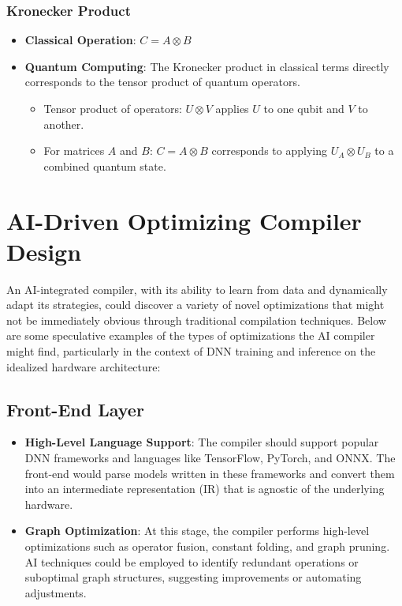 \documentclass{article}
\begin{document}
\subsubsection{Kronecker Product}
\begin{itemize}
    \item \textbf{Classical Operation}: \( C = A \otimes B \)
    \item \textbf{Quantum Computing}: The Kronecker product in classical terms directly corresponds to the tensor product of quantum operators.
    \begin{itemize}
        \item Tensor product of operators: \( U \otimes V \) applies \( U \) to one qubit and \( V \) to another.
        \item For matrices \( A \) and \( B \): \( C = A \otimes B \) corresponds to applying \( U_A \otimes U_B \) to a combined quantum state.
    \end{itemize}
\end{itemize}

\section{AI-Driven Optimizing Compiler Design}

An AI-integrated compiler, with its ability to learn from data and dynamically adapt its strategies, could discover a variety of novel optimizations that might not be immediately obvious through traditional compilation techniques. Below are some speculative examples of the types of optimizations the AI compiler might find, particularly in the context of DNN training and inference on the idealized hardware architecture:

\subsection{Front-End Layer}
\begin{itemize}
    \item \textbf{High-Level Language Support}: The compiler should support popular DNN frameworks and languages like TensorFlow, PyTorch, and ONNX. The front-end would parse models written in these frameworks and convert them into an intermediate representation (IR) that is agnostic of the underlying hardware.
    \item \textbf{Graph Optimization}: At this stage, the compiler performs high-level optimizations such as operator fusion, constant folding, and graph pruning. AI techniques could be employed to identify redundant operations or suboptimal graph structures, suggesting improvements or automating adjustments.
\end{itemize}
\end{document}
